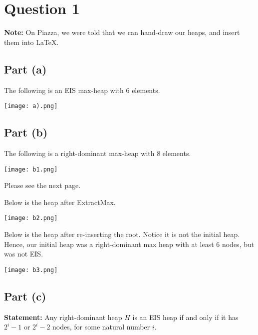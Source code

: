 \documentclass[12pt]{article}
\begin{document}

\setlength\parindent{0pt}

\section*{Question 1}

\textbf{Note:} On Piazza, we were told that we can hand-draw our heaps, and insert them into LaTeX. 

\subsection*{Part (a)}

The following is an EIS max-heap with 6 elements. 

\texttt{[image: a).png]}

\subsection*{Part (b)}

The following is a right-dominant max-heap with 8 elements. 

\texttt{[image: b1.png]}

Please see the next page. 

\newpage

Below is the heap after ExtractMax. 

\texttt{[image: b2.png]}

Below is the heap after re-inserting the root. Notice it is not the initial heap. Hence, our initial heap was a right-dominant max heap with at least 6 nodes, but was not EIS. 

\texttt{[image: b3.png]} 



\newpage

\subsection*{Part (c)}

\textbf{Statement:} Any right-dominant heap $H$ is an EIS heap if and only if it has $2^i - 1$ or $2^i - 2$ nodes, for some natural number $i$. 
\end{document}
